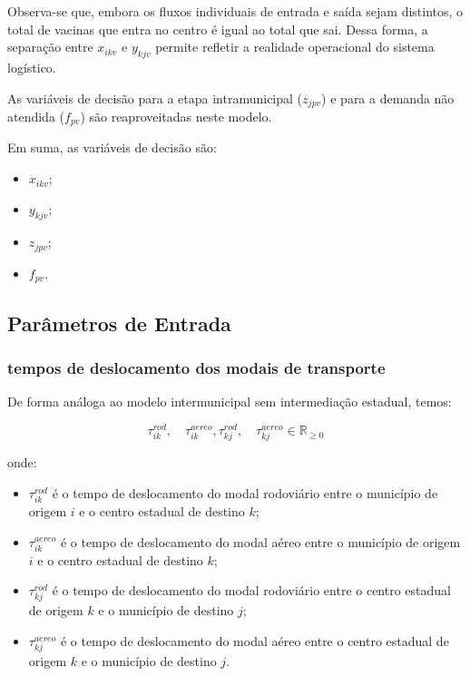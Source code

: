 Observa-se que, embora os fluxos individuais de entrada e saída sejam distintos, o total de vacinas que entra no centro é igual ao total que sai. Dessa forma, a separação entre $x_{ikv}$ e $y_{kjv}$ permite refletir a realidade operacional do sistema logístico.

As variáveis de decisão para a etapa intramunicipal ($z_{jpv}$) e para a demanda não atendida ($f_{pv}$) são reaproveitadas neste modelo.

Em suma, as variáveis de decisão são:

\begin{itemize}
    \item $x_{ikv}$;
    \item $y_{kjv}$;
    \item $z_{jpv}$;
    \item $f_{pv}$.
\end{itemize}

\subsection{Parâmetros de Entrada}

\subsubsection{tempos de deslocamento dos modais de transporte}

De forma análoga ao modelo intermunicipal sem intermediação estadual, temos:

\[
\tau_{ik}^{rod}, \quad \tau_{ik}^{aereo}, \tau_{kj}^{rod}, \quad \tau_{kj}^{aereo} \in \mathbb{R}_{\geq 0}
\]

onde:
\begin{itemize}
    \item $\tau_{ik}^{rod}$ é o tempo de deslocamento do modal rodoviário entre o município de origem $i$ e o centro estadual de destino $k$;
    \item $\tau_{ik}^{aereo}$ é o tempo de deslocamento do modal aéreo entre o município de origem $i$ e o centro estadual de destino $k$;
    \item $\tau_{kj}^{rod}$ é o tempo de deslocamento do modal rodoviário entre o centro estadual de origem $k$ e o município de destino $j$;
    \item $\tau_{kj}^{aereo}$ é o tempo de deslocamento do modal aéreo entre o centro estadual de origem $k$ e o município de destino $j$.
\end{itemize}

